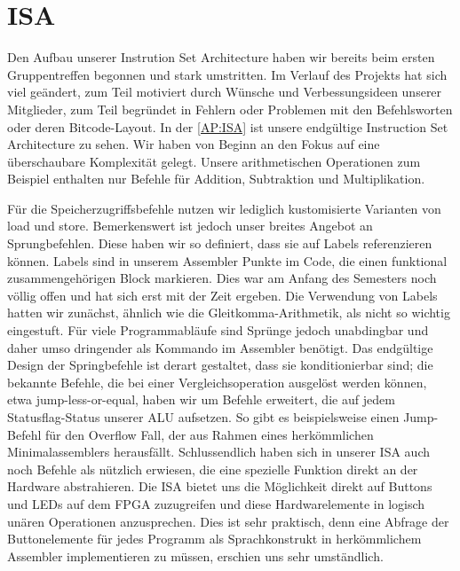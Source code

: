 
\section{ISA} %
Den Aufbau unserer Instrution Set Architecture haben wir bereits beim ersten Gruppentreffen begonnen und stark umstritten. Im Verlauf des Projekts hat sich viel geändert, zum Teil motiviert durch Wünsche und Verbessungsideen unserer Mitglieder, zum Teil begründet in Fehlern oder Problemen mit den Befehlsworten oder deren Bitcode-Layout.
In der \autoref{AP:ISA} ist unsere endgültige Instruction Set Architecture zu sehen. Wir haben von Beginn an den Fokus auf eine überschaubare Komplexität gelegt. Unsere arithmetischen Operationen zum Beispiel enthalten nur Befehle für Addition, Subtraktion und Multiplikation. 

Für die Speicherzugriffsbefehle nutzen wir lediglich kustomisierte Varianten von load und store. Bemerkenswert ist jedoch unser breites Angebot an Sprungbefehlen. Diese haben wir so definiert, dass sie auf Labels referenzieren können.  Labels sind in unserem Assembler Punkte im Code, die einen funktional zusammengehörigen Block markieren. Dies war am Anfang des Semesters noch völlig offen und hat sich erst mit der Zeit ergeben. Die Verwendung von Labels hatten wir zunächst, ähnlich wie die Gleitkomma-Arithmetik, als nicht so wichtig eingestuft. Für viele Programmabläufe sind Sprünge jedoch unabdingbar und daher umso dringender als Kommando im Assembler benötigt. Das endgültige Design der Springbefehle ist derart gestaltet, dass sie konditionierbar sind; die bekannte Befehle, die bei einer Vergleichsoperation ausgelöst werden können, etwa jump-less-or-equal, haben wir um Befehle erweitert, die auf jedem Statusflag-Status unserer ALU aufsetzen. So gibt es beispielsweise einen Jump-Befehl für den Overflow Fall, der aus Rahmen eines herkömmlichen Minimalassemblers herausfällt.
Schlussendlich haben sich in unserer ISA auch noch Befehle als nützlich erwiesen, die eine spezielle Funktion direkt an der Hardware abstrahieren. Die ISA bietet uns die Möglichkeit direkt auf Buttons und LEDs auf dem FPGA zuzugreifen und diese Hardwarelemente in logisch unären Operationen anzusprechen. Dies ist sehr praktisch, denn eine Abfrage der Buttonelemente für jedes Programm als Sprachkonstrukt in herkömmlichem Assembler implementieren zu müssen, erschien uns sehr umständlich.

